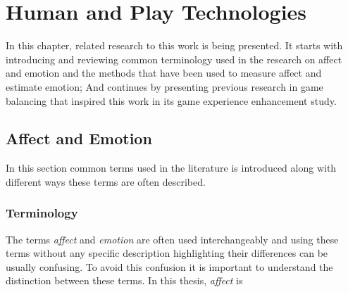 \documentclass{uofsthesis-cs}
\begin{document}

\chapter{Human and Play Technologies}
\label{chap:man-n-play}



In this chapter, related research to this work is being presented. It starts with introducing and reviewing common terminology used in the research on affect and emotion and the methods that have been used to measure affect and estimate emotion; And continues by presenting previous research in game balancing that inspired this work in its game experience enhancement study.

\section{Affect and Emotion}

In this section common terms used in the literature is introduced along with different ways these terms are often described.

\subsection{Terminology}

The terms \textit{affect} and \textit{emotion} are often used interchangeably and using these terms without any specific description highlighting their differences can be usually confusing. To avoid this confusion it is important to understand the distinction between these terms. In this thesis, \textit{affect} is 
\end{document}
